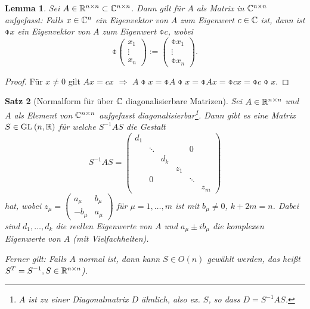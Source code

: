 \documentclass[
 a4paper,
 12pt,
 parskip=half
 ]{scrartcl}
\theoremstyle{plain}
\newtheorem{thm}{Satz}[section] %
\newtheorem{lem}[thm]{Lemma}
\theoremstyle{definition}
\begin{document}
\begin{lem}
 Sei $A \in \mathbb{R}^{n \times n} \subset \mathbb{C}^{n \times n}$. Dann gilt für $A$ als Matrix in $\mathbb{C}^{n \times n}$ aufgefasst: Falls $x \in \mathbb{C}^n$ ein Eigenvektor von $A$ zum Eigenwert $c \in \mathbb{C}$ ist, dann ist $\obar{x}$ ein Eigenvektor von $A$ zum Eigenwert $\obar{c}$, wobei
 \[ \obar{\begin{pmatrix} x_1 \\ \vdots \\ x_n \end{pmatrix}} := \begin{pmatrix} \obar{x}_1 \\ \vdots \\ \obar{x}_n \end{pmatrix}. \]
\end{lem}

\begin{proof}
 Für $x \ne 0$ gilt $Ax = cx $ $\Rightarrow$  $A\obar{x} = \obar{A}\obar{x} = \obar{Ax} = \obar{cx} = \obar{c} \obar{x}$.
\end{proof}

\begin{thm}[Normalform für über $\mathbb{C}$ diagonalisierbare Matrizen]
 Sei $A \in \mathbb{R}^{n \times n}$ und $A$ als Element von $\mathbb{C}^{n \times n}$ aufgefasst diagonalisierbar\footnote{$A$ ist zu einer Diagonalmatrix $D$ ähnlich, also ex. $S$, so dass $D=S^{-1} A S$.}. Dann gibt es eine Matrix $S \in \mathrm{GL}\,(n, \mathbb{R})$ für welche $S^{-1} A S$ die Gestalt
 \[ S^{-1} A S = \begin{pmatrix}
     d_1 &        &     &     &        &      \\
         & \ddots &     &     & 0      &      \\
         &        & d_k &     &        &      \\
         &        &     & \boxed{z_1} &        &      \\
         & 0      &     &     & \ddots &      \\
         &        &     &     &        & \boxed{z_m}
    \end{pmatrix} \]
 hat, wobei $z_\mu = \begin{pmatrix} a_\mu & b_\mu \\ -b_\mu & a_\mu \end{pmatrix}$ für $\mu = 1, \ldots, m$ ist mit $b_\mu \ne 0$, $k+2m = n$. Dabei sind $d_1, \ldots, d_k$ die reellen Eigenwerte von $A$ und $a_\mu \pm i b_\mu$ die komplexen Eigenwerte von $A$ (mit Vielfachheiten).
 
 Ferner gilt: Falls $A$ normal ist, dann kann $S \in O(n)$ gewählt werden, das heißt $S^T = S^{-1}, S \in \mathbb{R}^{n \times n}$).
\end{thm}
\end{document}
